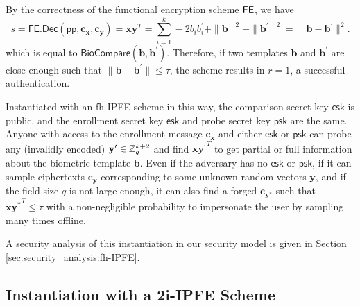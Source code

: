 By the correctness of the functional encryption scheme $\sf FE$, we have
\[
	s = \textsf{FE.Dec}(\textsf{pp}, \mathbf{c_x}, \mathbf{c_y}) =  \mathbf{x} \mathbf{y}^T = \sum_{i=1}^k -2b_ib_i^\prime + \|\mathbf{b}\|^2 + \|\mathbf{b}^\prime\|^2 = \| \mathbf{b} - \mathbf{b}^\prime \|^2.
\]
which is equal to $\textsf{BioCompare}(\mathbf{b}, \mathbf{b}^\prime)$. Therefore, if two templates $\mathbf{b}$ and $\mathbf{b}^\prime$ are close enough such that $\|\mathbf{b} - \mathbf{b}^\prime\| \leq \tau$, the scheme results in $r = 1$, a successful authentication.

Instantiated with an fh-IPFE scheme in this way, the comparison secret key $\textsf{csk}$ is public, and the enrollment secret key $\textsf{esk}$ and probe secret key $\textsf{psk}$ are the same. Anyone with access to the enrollment message $\mathbf{c_x}$ and either $\textsf{esk}$ or $\textsf{psk}$ can probe any (invalidly encoded) $\mathbf{y}^{\prime} \in \mathbb{Z}_q^{k+2}$ and find $\mathbf{x} {\mathbf{y}^\prime}^T$ to get partial or full information about the biometric template $\mathbf{b}$. Even if the adversary has no $\textsf{esk}$ or $\textsf{psk}$, if it can sample ciphertexts $\mathbf{c_{y}}$ corresponding to some unknown random vectors $\mathbf{y}$, and if the field size $q$ is not large enough, it can also find a forged $\mathbf{c_{y^*}}$ such that $\mathbf{x}\mathbf{y^*}^T \leq \tau$ with a non-negligible probability to impersonate the user by sampling many times offline.

A security analysis of this instantiation in our security model is given in Section \ref{sec:security_analysis:fh-IPFE}.





\iffalse

\subsection{Instantiation with a 2i-IPFE Scheme}
\label{sec:2i-IPFE-instantiation}

